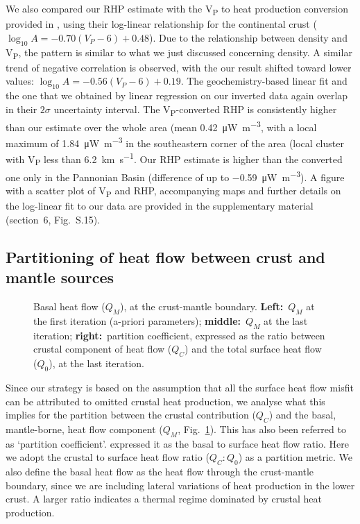 {We also compared our RHP estimate with the V\textsubscript{P} to heat production conversion provided in \textcite{Hasterok2017_ign}, using their log-linear relationship for the continental crust ($\log_{10} A = -0.70 (V_{P} - 6) + 0.48$).
Due to the relationship between density and V\textsubscript{P}, the pattern is similar to what we just discussed concerning density. A similar trend of negative correlation is observed, with the our result shifted toward lower values: $\log_{10} A = -0.56 (V_{P} - 6) + 0.19$.
The geochemistry-based linear fit and the one that we obtained by linear regression on our inverted data again overlap in their $2\sigma$ uncertainty interval.
The V\textsubscript{P}-converted RHP is consistently higher than our estimate over the whole area (mean \SI[retain-explicit-plus]{+0.42}{\micro \watt \per \cubic \metre}, with a local maximum of \SI[retain-explicit-plus]{+1.84}{\micro \watt \per \cubic \metre} in the southeastern corner of the area (local cluster with V\textsubscript{P} less than \SI{6.2}{\kilo \metre \per \second}.
Our RHP estimate is higher than the converted one only in the Pannonian Basin (difference of up to \SI{-0.59}{\micro \watt \per \cubic \metre}).
A figure with a scatter plot of V\textsubscript{P} and RHP, accompanying maps and further details on the log-linear fit to our data are provided in the supplementary material (section~6, Fig.~S.15).

\subsection{Partitioning of heat flow between crust and mantle sources}
\label{ss:Appl:DiscTherm:Partition}

\begin{figure}
	\begin{adjustbox}{center}
	\end{adjustbox}
	\caption{Basal heat flow ($Q_M$), at the crust-mantle boundary. \textbf{Left:}~$Q_M$ at the first iteration (a-priori parameters); \textbf{middle:}~$Q_M$ at the last iteration; \textbf{right:}~partition coefficient, expressed as the ratio between crustal component of heat flow ($Q_C$) and the total surface heat flow ($Q_0$), at the last iteration.}
	\label{fig:QM}
\end{figure}

Since our strategy is based on the assumption that all the surface heat flow misfit can be attributed to omitted crustal heat production, we analyse what this implies for the partition between the crustal contribution ($Q_C$) and the basal, mantle-borne, heat flow component ($Q_M$, Fig.~\ref{fig:QM}).
This has also been referred to as `partition coefficient'. \textcite{Hasterok2016} expressed it as the basal to surface heat flow ratio.
Here we adopt the crustal to surface heat flow ratio ($Q_C:Q_0$) as a partition metric.
We also define the basal heat flow as the heat flow through the crust-mantle boundary, since we are including lateral variations of heat production in the lower crust.
A larger ratio indicates a thermal regime dominated by crustal heat production.

}
